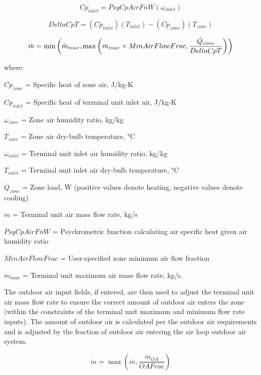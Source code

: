 \begin{equation}
C{p_{inlet}} = PsyCpAirFnW\left( {{\omega_{inlet}}} \right)
\end{equation}

\begin{equation}
DeltaCpT = \left( {C{p_{inlet}}} \right)\left( {{T_{inlet}}} \right) - \left( {C{p_{zone}}} \right)\left( {{T_{zone}}} \right)
\end{equation}

\begin{equation}
  \dot{m} = \min \PB{ \dot{m}_{max}, \max \PB{ \dot{m}_{max}\times MinAirFlowFrac,\frac{\dot{Q}_{zone}}{DeltaCpT} } }
\end{equation}

where:

\(C{p_{zone}}\) = Specific heat of zone air, J/kg-K

\(C{p_{inlet}}\) = Specific heat of terminal unit inlet air, J/kg-K

\({\omega_{zone}}\) = Zone air humidity ratio, kg/kg

\({T_{zone}}\) = Zone air dry-bulb temperature, °C

\({\omega_{inlet}}\) = Terminal unit inlet air humidity ratio, kg/kg

\({T_{inlet}}\) = Terminal unit inlet air dry-bulb temperature, °C

\({\dot Q_{zone}}\) = Zone load, W (positive values denote heating, negative values denote cooling)

\(\dot m\) = Terminal unit air mass flow rate, kg/s

\(PsyCpAirFnW\) = Psychrometric function calculating air specific heat given air humidity ratio

\(MinAirFlowFrac\) = User-specified zone minimum air flow fraction

\({\dot m_{max}}\) = Terminal unit maximum air mass flow rate, kg/s.

The outdoor air input fields, if entered, are then used to adjust the terminal unit air mass flow rate to ensure the correct amount of outdoor air enters the zone (within the constraints of the terminal unit maximum and minimum flow rate inputs). The amount of outdoor air is calculated per the outdoor air requirements and is adjusted by the fraction of outdoor air entering the air loop outdoor air system.

\begin{equation}
\dot m = \max \left( \dot m, \frac{\dot m_{OA}}{OAFrac} \right)
\end{equation}

